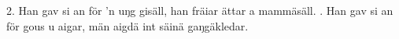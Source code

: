 \setlength{\columnsep}{0cm}
\begin{multicols}{2}
2.  Han gav si an för ’n uŋg gisäll,
    han fräiar ättar a mammäsäll.
\vfill{}.  Han gav si an för gous u aigar,
    män aigdä int säinä gaŋgäkledar.
\end{multicols}
